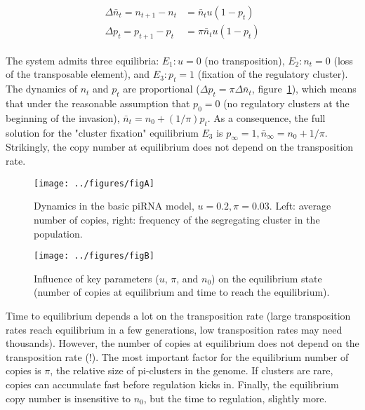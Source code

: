 \documentclass[10pt,a4paper]{article}
\begin{document}
\begin{align}\label{eq:basic}
\begin{split}
\Delta \bar n_t = n_{t+1} - n_t &= \bar n_t u (1-p_t) \\
\Delta p_t = p_{t+1} - p_t &= \pi \bar n_t u (1-p_t)
\end{split}
\end{align}

The system admits three equilibria: $E_1: u = 0$ (no transposition), $E_2: n_t = 0$ (loss of the transposable element), and $E_3: p_t = 1$ (fixation of the regulatory cluster). The dynamics of $n_t$ and $p_t$ are proportional ($\Delta p_t = \pi \Delta \bar n_t$, figure~\ref{fig:figA}), which means that under the reasonable assumption that $p_0 = 0$ (no regulatory clusters at the beginning of the invasion), $\bar n_t = n_0 + (1/\pi) p_t$. As a consequence, the full solution for the "cluster fixation" equilibrium $E_3$ is $p_\infty = 1, \bar n_\infty = n_0 + 1/\pi$. Strikingly, the copy number at equilibrium does not depend on the transposition rate. 

\begin{figure}[h]
\begin{adjustwidth}{-1in}{0in}
\begin{flushright}
	\texttt{[image: ../figures/figA]}
\caption{\label{fig:figA} Dynamics in the basic piRNA model, $u=0.2, \pi=0.03$. Left: average number of copies, right: frequency of the segregating cluster in the population. }
\end{flushright}\end{adjustwidth}
\end{figure}


\begin{figure}[t]
\begin{adjustwidth}{-1in}{0in}
\begin{flushright}
\texttt{[image: ../figures/figB]}
\caption{Influence of key parameters ($u$, $\pi$, and $n_0$) on the equilibrium state (number of copies at equilibrium and time to reach the equilibrium). }
\end{flushright}\end{adjustwidth}
\end{figure}


Time to equilibrium depends a lot on the transposition rate (large transposition rates reach equilibrium in a few generations, low transposition rates may need thousands). However, the number of copies at equilibrium does not depend on the transposition rate (!). The most important factor for the equilibrium number of copies is $\pi$, the relative size of pi-clusters in the genome. If clusters are rare, copies can accumulate fast before regulation kicks in. Finally, the equilibrium copy number is insensitive to $n_0$, but the time to regulation, slightly more. 
\end{document}
